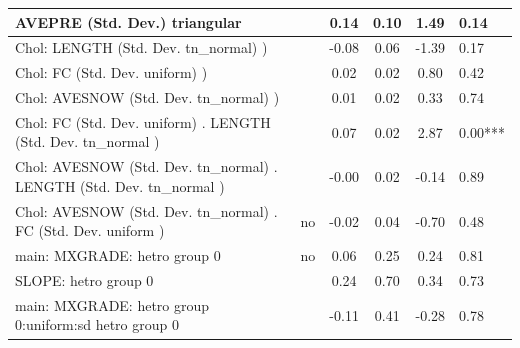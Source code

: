 \begin{table}
\begin{center}
\begin{tabular}{|l|l|c|c|c|l|}
			\hline
			AVEPRE (Std. Dev.) triangular &  & 0.14 & 0.10 & 1.49 & 0.14 \\
			\hline
			 Chol: LENGTH (Std. Dev. tn_normal) ) &  & -0.08 & 0.06 & -1.39 & 0.17 \\
			\hline
			 Chol: FC (Std. Dev. uniform) ) &  & 0.02 & 0.02 & 0.80 & 0.42 \\
			\hline
			 Chol: AVESNOW (Std. Dev. tn_normal) ) &  & 0.01 & 0.02 & 0.33 & 0.74 \\
			\hline
			 Chol: FC (Std. Dev. uniform) . LENGTH (Std. Dev.   tn_normal ) &  & 0.07 & 0.02 & 2.87 & 0.00*** \\
			\hline
			 Chol: AVESNOW (Std. Dev. tn_normal) . LENGTH (Std. Dev.   tn_normal ) &  & -0.00 & 0.02 & -0.14 & 0.89 \\
			\hline
			 Chol: AVESNOW (Std. Dev. tn_normal) . FC (Std. Dev.   uniform ) & no & -0.02 & 0.04 & -0.70 & 0.48 \\
			\hline
			main: MXGRADE: hetro group 0 & no & 0.06 & 0.25 & 0.24 & 0.81 \\
			\hline
			SLOPE: hetro group 0 &  & 0.24 & 0.70 & 0.34 & 0.73 \\
			\hline
			main: MXGRADE: hetro group 0:uniform:sd  hetro group 0 &  & -0.11 & 0.41 & -0.28 & 0.78 \\
			\hline
		\end{tabular}
	\end{center}
\end{table}